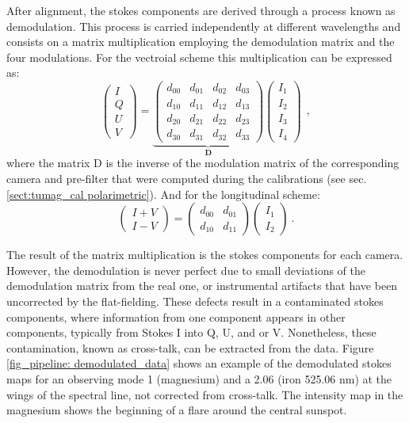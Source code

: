 After alignment, the stokes components are derived through a process known as demodulation. This process is carried independently at different wavelengths and consists on a matrix multiplication employing the demodulation matrix and the four modulations. For the vectroial scheme this multiplication can be expressed as:
\begin{equation}
  \begin{pmatrix}
  I \\
  Q \\
  U \\
  V
  \end{pmatrix} = 
  \underbrace{\begin{pmatrix} 
      d _ {00} & d _ {01} & d _ {02} & d _ {03} \\ 
      d _ {10} & d _ {11} & d _ {12} & d _ {13} \\
      d _ {20} & d _ {21} & d _ {22} & d _ {23} \\
      d _ {30} & d _ {31} & d _ {32} & d _ {33} 
  \end{pmatrix}}_ {\textbf{D}}
  \begin{pmatrix}
    I _ {1} \\
    I _ {2} \\
    I _ {3} \\
    I _ {4}
    \end{pmatrix} \ \ , 
    \label{pipeline: Demod}
\end{equation}
where the matrix D is the inverse of the modulation matrix of the corresponding camera and pre-filter that were computed during the calibrations (see sec. \ref{sect:tumag_cal polarimetric}). And for the longitudinal scheme:
\begin{equation}
  \begin{pmatrix}
  I + V\\
  I - V
  \end{pmatrix} = 
  \begin{pmatrix} 
      d _ {00} & d _ {01} \\ 
      d _ {10} & d _ {11}
  \end{pmatrix}
  \begin{pmatrix}
    I _ {1} \\
    I _ {2} 
  \end{pmatrix} \ .
    \label{pipeline: Demod_long}
\end{equation}

The result of the matrix multiplication is the stokes components for each camera. However, the demodulation is never perfect due to small deviations of the demodulation matrix from the real one, or instrumental artifacts that have been uncorrected by the flat-fielding. These defects result in a contaminated stokes components, where information from one component appears in other components, typically from Stokes I into Q, U, and or V. Nonetheless, these contamination, known as cross-talk, can be extracted from the data. Figure \ref{fig_pipeline: demodulated_data} shows an example of the demodulated stokes maps for an observing mode 1 (magnesium) and a 2.06 (iron 525.06 nm) at the wings of the spectral line, not corrected from cross-talk. The intensity map in the magnesium shows the beginning of a flare around the central sunspot. 



